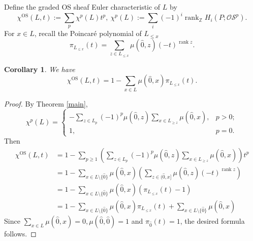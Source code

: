 \documentclass{amsart}
\numberwithin{equation}{section}
\newtheorem{cor}[thm]{Corollary}
\theoremstyle{plain}
\theoremstyle{remark}
\theoremstyle{definition}
\numberwithin{equation}{section}
\newcommand{\Z}{\mathbb{Z}}
\newcommand{\OS}{\mathrm{OS}}
\newcommand{\sOS}{\mathscr{OS}}
\DeclareMathOperator{\rank}{rank}
\begin{document}
Define the graded OS sheaf Euler characteristic of $L$ by
\[
\chi^\OS(L,t):=\sum_{p}\chi^p(L)t^p,~\chi^p(L):=\sum_i(-1)^i\rank_{\Z}H_i(P;\sOS^p).
\]
For $x\in L$, recall the Poincar\'e polynomial of $L_{\leq x}$
\[
\pi_{L_{\leq x}}(t)=\sum_{z\in L_{\leq x}}\mu(\hat{0},z)(-t)^{\rank z}.
\]
\begin{cor}
    We have
    \[
    \chi^\OS(L,t)=1-\sum_{x\in L}\mu(\hat{0},x)\pi_{L_{\leq x}}(t).
    \]
\end{cor}
\begin{proof}
    By Theorem \ref{main},
    \[
    \chi^p(L)=\begin{cases}
        -\sum_{z\in L_p}(-1)^p\mu(\hat 0,z)\sum_{x\in L_{\geq z}}\mu(\hat0,x), & p>0;\\
        1, & p=0.
    \end{cases}
    \]
    Then
    \begin{align*}
        \chi^\OS(L,t)&=1-\sum_{p\geq 1}\left(\sum_{z\in L_p}(-1)^p\mu(\hat 0,z)\sum_{x\in L_{\geq z}}\mu(\hat0,x)\right)t^p\\
        &=1-\sum_{x\in L\setminus\{\hat0\}}\mu(\hat0,x)\left(\sum_{z\in (\hat0,x]}\mu(\hat0 ,z)(-t)^{\rank z}\right)\\
        &=1-\sum_{x\in L\setminus\{\hat0\}}\mu(\hat0,x)(\pi_{L_{\leq x}}(t)-1)\\
        &=1-\sum_{x\in L\setminus\{\hat0\}}\mu(\hat0,x)\pi_{L_{\leq x}}(t)+\sum_{x\in L\setminus\{\hat0\}}\mu(\hat0,x)
    \end{align*}
    Since $\sum_{x\in L}\mu(\hat0,x)=0,\mu(\hat 0,\hat0)=1$ and $\pi_{\hat0}(t)=1$, the desired formula follows.
\end{proof}
\end{document}
